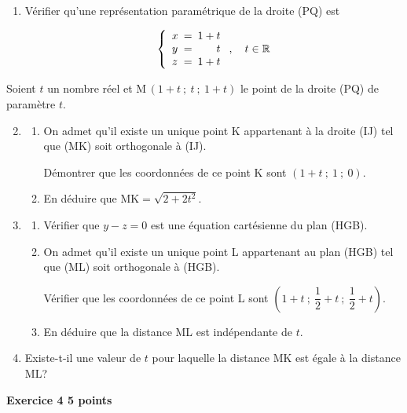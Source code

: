 \documentclass[10pt,a4paper]{article}
\newcommand{\R}{\mathbb{R}}
\newcommand{\ds}{\displaystyle}%
\begin{document}
\begin{enumerate}
\item Vérifier qu'une représentation paramétrique de la droite (PQ) est

\[\left \lbrace
\begin{array}{l !{=} r}
x& 1+t\\
y & t \\
z & 1+t\\
\end{array}
\right . ,\quad t\in\R\]

\end{enumerate}

Soient $t$ un nombre réel et M\,$(1+t~;~t~;~1+t)$ le point de la droite (PQ) de paramètre $t$.

\begin{enumerate}
\setcounter{enumi}{1}
\item 
\begin{enumerate}
\item On admet qu'il existe un unique point K appartenant à la droite (IJ) tel que (MK) soit orthogonale à (IJ).

Démontrer que les coordonnées de ce point K sont $(1+t~;~1~;~0)$.
\item En déduire que $\text{MK} = \ds\sqrt{2+2t^2}$.
\end{enumerate}

\item
	\begin{enumerate}
		\item Vérifier que $y-z=0$ est une équation cartésienne du plan (HGB).
		\item On admet qu'il existe un unique point L appartenant au plan (HGB) tel que (ML) soit orthogonale à (HGB).

\smallskip

Vérifier que les coordonnées de ce  point L sont $\left (1+t~;~\dfrac{1}{2}+t~;~\dfrac{1}{2}+t\right )$.
		\item En déduire que la distance ML est indépendante de $t$.
	\end{enumerate}
\item Existe-t-il une valeur de $t$ pour laquelle la distance MK est égale à la distance ML?
\end{enumerate}

\vspace{0,25cm}

\textbf{Exercice 4 \hfill 5 points}

\medskip
\end{document}
